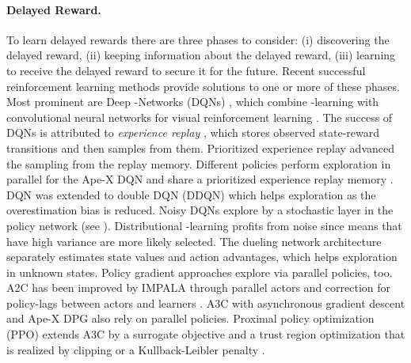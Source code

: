 \documentclass{article}
\begin{document}
\begin{appendices}
\paragraph{Delayed Reward.}

To learn delayed rewards there are three phases to consider:
(i) discovering the delayed reward,
(ii) keeping information about the delayed reward,
(iii) learning to receive the delayed reward to secure it for the future.
Recent successful reinforcement learning methods provide solutions to one
or more of these phases.
Most prominent are
Deep -Networks (DQNs) \cite{Mnih:13,Mnih:15}, which
combine -learning with convolutional neural networks for 
visual reinforcement learning \cite{Koutnik:13}.
The success of DQNs is attributed to
{\em experience replay} \cite{Lin:93}, which stores
observed state-reward transitions and then samples from them.
Prioritized experience replay \cite{Schaul:15,Horgan:18} advanced the
sampling from the replay memory.
Different policies perform exploration in parallel for the Ape-X DQN 
and share a prioritized experience replay memory \cite{Horgan:18}.
DQN was extended to double DQN (DDQN) \cite{Hasselt:10,Hasselt:16}
which helps exploration as the overestimation bias is reduced.
Noisy DQNs \cite{Fortunato:18} explore by
a stochastic layer in the policy network (see \cite{Hochreiter:90,Schmidhuber:90diff}).
Distributional -learning \cite{Bellemare:17} profits from noise since means that
have high variance are more likely selected.
The dueling network architecture \cite{Wang:15,Wang:16} separately
estimates state values and action advantages,
which helps exploration in unknown states.
Policy gradient approaches \cite{Williams:92} explore via parallel
policies, too. 
A2C has been improved by IMPALA through parallel actors and
correction for policy-lags between actors and learners \cite{Espeholt:18}.
A3C with asynchronous gradient descent \cite{Mnih:16}
and  Ape-X DPG \cite{Horgan:18} also rely on parallel policies.
Proximal policy optimization (PPO) extends A3C by a surrogate
objective and a trust region optimization that is realized by clipping or
a Kullback-Leibler penalty \cite{Schulman:17}.


\end{appendices}
\end{document}
